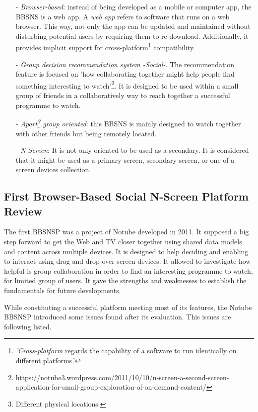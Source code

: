 \documentclass{acm_proc_article-sp}
\begin{document}
\begin{itemize}
  	\item [-]\textit{Browser-based}: instead of being developed as a mobile or computer app, the BBSNS is a web app. A \textit{web app} refers to software that runs on a web browser. This way, not only the app can be updated and maintained without disturbing potential users by requiring them to re-download. Additionally, it provides implicit support for cross-platform\cite{web:cp}\footnote{\textit{'Cross-platform} regards the capability of a software to run identically on different platforms.'} compatibility. 
	\item [-]\textit{Group decision recommendation system -Social-}. The recommendation feature is focused on 'how collaborating together might help people find something interesting to watch'\footnote{https://notube3.wordpress.com/2011/10/10/n-screen-a-second-screen-application-for-small-group-exploration-of-on-demand-content/}. It is designed to be used within a small group of friends in a collaboratively way to reach together a successful programme to watch. 
	\item [-]\textit{Apart\footnote{Different physical locations.} group oriented}: this BBSNS is mainly designed to watch together with other friends but being remotely located. 
	\item [-]\textit{N-Screen}: It is not only oriented to be used as a secondary. It is considered that it might be used as a primary screen, secondary screen, or one of a screen devices collection. 
\end{itemize}

\subsection{First Browser-Based Social N-Screen Platform Review} \label{firstNScreen}

The first BBSNSP was a project of Notube developed in 2011. It supposed a big step forward to get the Web and TV closer together using shared data models and content across multiple devices\cite{schopman2010notube}. It is designed to help deciding and enabling to interact using drag and drop over screen devices. It allowed to investigate  how helpful is group collaboration in order to find an interesting programme to watch, for limited group of users. It gave the strengths and weaknesses to establish the fundamentals for future developments.

While constituting a successful platform meeting most of its features, the Notube BBSNSP introduced some issues found after its evaluation. This issues are following listed. 
\end{document}
